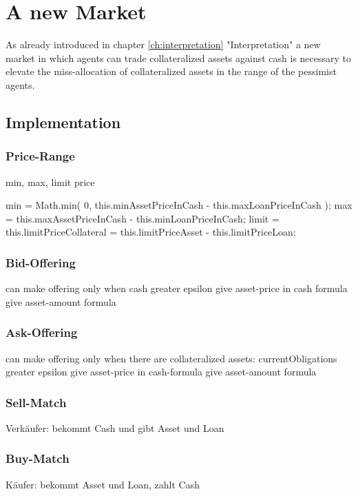 \documentclass[Bachelorarbeit.tex]{subfiles}
\begin{document}
\graphicspath{{./figures/newMarket/}}	%

\chapter{A new Market}
As already introduced in chapter \ref{ch:interpretation} "Interpretation" a new market in which agents can trade collateralized assets against cash is necessary to elevate the miss-allocation of collateralized assets in the range of the pessimist agents.

\section{Implementation}

\subsection{Price-Range}
min, max, limit price

min = Math.min( 0, this.minAssetPriceInCash - this.maxLoanPriceInCash );
max = this.maxAssetPriceInCash - this.minLoanPriceInCash;
limit = this.limitPriceCollateral = this.limitPriceAsset - this.limitPriceLoan;\\

\subsection{Bid-Offering}
can make offering only when cash greater epsilon
give asset-price in cash formula
give asset-amount formula
	
\subsection{Ask-Offering}
can make offering only when there are collateralized assets: currentObligations greater epsilon
give asset-price in cash-formula
give asset-amount formula

\subsection{Sell-Match}
Verkäufer: 	bekommt Cash und gibt Asset und Loan

\subsection{Buy-Match}
Käufer: bekommt Asset und Loan, zahlt Cash
\end{document}
